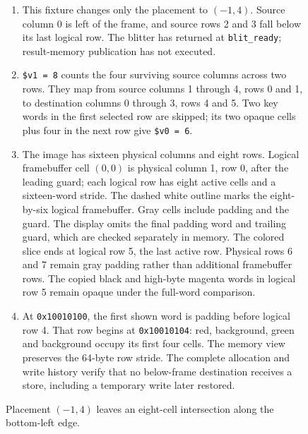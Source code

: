 \begin{figure}[htbp]
  \par\smallskip
  \begin{minipage}{\linewidth}
    \small
    \begin{enumerate}
      \setlength{\itemsep}{2pt}
            \setlength{\parsep}{0pt}
      \item This fixture changes only the placement to $(-1,4)$. Source column 0 is left of the frame, and source rows 2 and 3 fall below its last logical row. The blitter has returned at \texttt{blit\_ready}; result-memory publication has not executed.
      \item \texttt{\$v1 = 8} counts the four surviving source columns across two rows. They map from source columns 1 through 4, rows 0 and 1, to destination columns 0 through 3, rows 4 and 5. Two key words in the first selected row are skipped; its two opaque cells plus four in the next row give \texttt{\$v0 = 6}.
      \item The image has sixteen physical columns and eight rows. Logical framebuffer cell $(0,0)$ is physical column 1, row 0, after the leading guard; each logical row has eight active cells and a sixteen-word stride. The dashed white outline marks the eight-by-six logical framebuffer. Gray cells include padding and the guard. The display omits the final padding word and trailing guard, which are checked separately in memory. The colored slice ends at logical row 5, the last active row. Physical rows 6 and 7 remain gray padding rather than additional framebuffer rows. The copied black and high-byte magenta words in logical row 5 remain opaque under the full-word comparison.
      \item At \texttt{0x10010100}, the first shown word is padding before logical row 4. That row begins at \texttt{0x10010104}: red, background, green and background occupy its first four cells. The memory view preserves the 64-byte row stride. The complete allocation and write history verify that no below-frame destination receives a store, including a temporary write later restored.
    \end{enumerate}
  \end{minipage}
  \caption{Placement $(-1,4)$ leaves an eight-cell intersection along the bottom-left edge.}
  \label{capture:016-clipped-sprite-blitter-f04}
  \label{blit-f04}
\end{figure}
\par
